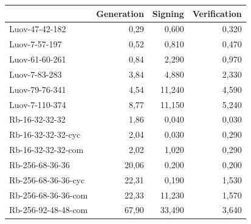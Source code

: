 \documentclass[thesis=M,english]{FITthesis}[2019/12/23]
\begin{document}
\begin{table}[]
\centering
\begin{tabular}{|l|r|r|r|}
\hline
                  & \multicolumn{1}{c|}{{ Generation}} & \multicolumn{1}{c|}{{ Signing}} & \multicolumn{1}{c|}{{ Verification}} \\ \hline
 Luov-47-42-182      &  0,29                            &  0,600                          &  0,320                              \\ \hline
 Luov-7-57-197       &  0,52                            &  0,810                         &  0,470                              \\ \hline
 Luov-61-60-261      &  0,84                            &  2,290                         &  0,970                              \\ \hline
 Luov-7-83-283       &  3,84                            &  4,880                         &  2,330                              \\ \hline
 Luov-79-76-341      &  4,54                            &  11,240                        &  4,590                              \\ \hline
 Luov-7-110-374      &  8,77                            &  11,150                        &  5,240                              \\ \hline
 Rb-16-32-32-32      &  1,86                            &  0,040                         &  0,030                              \\ \hline
 Rb-16-32-32-32-cyc  &  2,04                            &  0,030                         &  0,290                              \\ \hline
 Rb-16-32-32-32-com  &  2,02                            &  1,020                         &  0,290                              \\ \hline
 Rb-256-68-36-36     &  20,06                           &  0,200                          &  0,200                               \\ \hline
 Rb-256-68-36-36-cyc &  22,31                           &  0,190                         &  1,530                              \\ \hline
 Rb-256-68-36-36-com &  22,33                           &  11,230                        &  1,570                              \\ \hline
 Rb-256-92-48-48-com &  67,90                            &  33,490                        &  3,640                              \\ \hline

\end{tabular}
\end{table}
\end{document}
